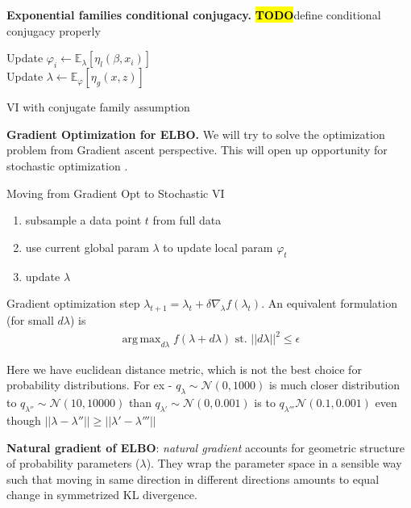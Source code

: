 \documentclass[letterpaper]{article}
\newcommand{\TODO}{\hl{\textbf{TODO}}}
\DeclareMathOperator*{\argmax}{arg\,max}
\newcommand{\cN}{\mathcal{N}}
\newcommand{\EEE}[2]{\mathbb{E}_{#1}\left[#2\right]}
\newcommand{\mypar}[1]{{\bf #1.}}
\begin{document}
  \mypar{Exponential families conditional conjugacy} \cite{pgmai18}
  \TODO define conditional conjugacy properly
  \begin{algorithm}[h]
     {
       {
          Update $\varphi_i \gets \EEE{\lambda}{\eta_l(\beta, x_i)}$\\
        }
        Update $\lambda \gets \EEE{\varphi}{\eta_g(x, z)}$\\
      }
    \caption{VI with conjugate family assumption}
    \label{alg:vi_conj}
  \end{algorithm}

  \mypar{Gradient Optimization for ELBO}
  We will try to solve the optimization problem from Gradient ascent perspective.
  This will open up opportunity for stochastic optimization \cite{robbins1951stochastic}
  \cite{robbins1985stochastic}.
  
  Moving from Gradient Opt to Stochastic VI
  \begin{enumerate}
    \item subsample a data point $t$ from full data
    \item use current global param $\lambda$ to update local param $\varphi_t$
    \item update $\lambda$
  \end{enumerate}

  Gradient optimization step $\lambda_{t + 1} = \lambda_{t} + \delta\nabla_{\lambda}f(\lambda_{t})$.
  An equivalent formulation (for small $d\lambda$) is
  \begin{align}
   \argmax_{d\lambda} f(\lambda + d\lambda) \text{ st. } ||d\lambda||^2 \leq \epsilon
  \end{align}

  Here we have euclidean distance metric, which is not the best choice for 
  probability distributions. For ex - $q_{\lambda} \sim \cN(0, 1000)$ is much closer
  distribution to $q_{\lambda{''}} \sim \cN(10, 10000)$ than $q_{\lambda{'}} \sim \cN(0, 0.001)$
  is to $q_{\lambda{'''}}\cN(0.1, 0.001)$ even though $||\lambda - \lambda{''}|| \geq ||\lambda{'} - \lambda{'''}||$

  {\bf Natural gradient of ELBO}: \emph{natural gradient} accounts for geometric
  structure of probability parameters ($\lambda$). They wrap the parameter space
  in a sensible way such that moving in same direction in different directions
  amounts to equal change in symmetrized KL divergence.
\end{document}
